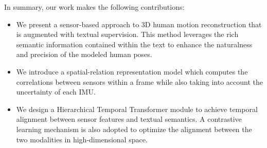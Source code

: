 \documentclass[letterpaper]{article} %
\begin{document}
In summary, our work makes the following contributions:
\begin{itemize}
\item We present a sensor-based approach to 3D human motion reconstruction that is augmented with textual supervision. This method leverages the rich semantic information contained within the text to enhance the naturalness and precision of the modeled human poses.
\item 
We introduce a spatial-relation representation model which computes the correlations between sensors within a frame while also taking into account the uncertainty of each IMU.
\item 
We design a Hierarchical Temporal Transformer module to achieve temporal alignment between sensor features and textual semantics. A contrastive learning mechanism is also adopted to optimize the alignment between the two modalities in high-dimensional space.
\end{itemize}

\end{document}
